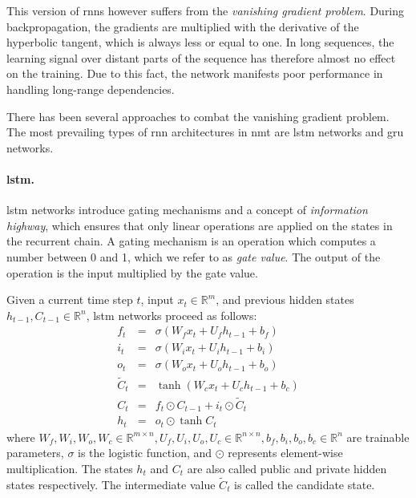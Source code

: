 This version of \glspl{rnn} however suffers from the \emph{vanishing gradient
problem}. During backpropagation, the gradients are multiplied with the
derivative of the hyperbolic tangent, which is always less or equal to one. In
long sequences, the learning signal over distant parts of the sequence has
therefore almost no effect on the training. Due to this fact, the network
manifests poor performance in handling long-range dependencies.

There has been several approaches to combat the vanishing gradient problem.  The
most prevailing types of \gls{rnn} architectures in \gls{nmt} are \gls{lstm}
networks and \gls{gru} networks.

\paragraph{\acrshort{lstm}.} \acrlong{lstm} networks \citep{hochreiter1997long}
introduce gating mechanisms and a concept of \emph{information highway}, which
ensures that only linear operations are applied on the states in the recurrent
chain. A gating mechanism is an operation which computes a number between 0 and
1, which we refer to as \emph{gate value}.  The output of the operation is the
input multiplied by the gate value.

Given a current time step $t$, input $x_t \in \mathbb{R}^m$, and previous hidden
states $h_{t-1}, C_{t-1} \in \mathbb{R}^n$, \gls{lstm} networks proceed as
follows:
%
\begin{eqnarray} f_t & = & \sigma\left(W_f x_t + U_f h_{t-1} + b_f\right)
\label{eq:lstm-forget-gate}\\ i_t & = & \sigma\left(W_i x_t + U_i h_{t-1} +
b_i\right)
\label{eq:lstm-input-gate}\\ o_t & = & \sigma\left(W_o x_t + U_o h_{t-1} +
b_o\right)
\label{eq:lstm-output-gate}\\ \tilde{C}_t & = & \tanh \left( W_c x_t + U_c
h_{t-1} + b_c \right)\label{eq:lstm-candidate} \\ C_t & = & f_t \odot C_{t-1} +
i_t \odot \tilde{C}_t
\label{eq:lstm-information-highway}\\ h_t & = & o_t \odot \tanh
C_t \label{eq:lstm-hidden-state}
\end{eqnarray}
%
where $W_f, W_i, W_o, W_c \in \mathbb{R}^{m \times n}, U_f, U_i, U_o, U_c \in
\mathbb{R}^{n \times n}, b_f, b_i, b_o, b_c \in \mathbb{R}^n$ are trainable
parameters, $\sigma$ is the logistic function, and $\odot$ represents
element-wise multiplication. The states $h_t$ and $C_t$ are also called public
and private hidden states respectively. The intermediate value $\tilde{C}_t$ is
called the candidate state.

